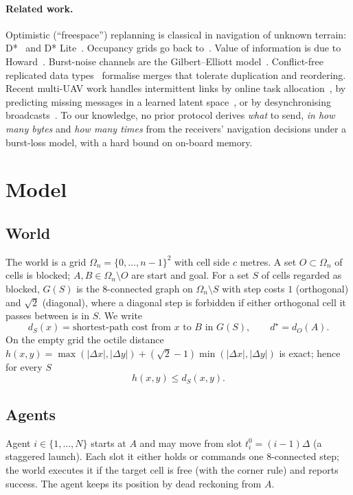 \documentclass[11pt,a4paper]{article}
\theoremstyle{definition}
\newcommand{\Om}{\Omega}
\begin{document}
\paragraph{Related work.} Optimistic (``freespace'') replanning is classical in navigation of unknown terrain: D*~\cite{stentz94} and D* Lite~\cite{koenig02}. Occupancy grids go back to~\cite{moravec85}. Value of information is due to Howard~\cite{howard66}. Burst-noise channels are the Gilbert--Elliott model~\cite{gilbert60,elliott63}. Conflict-free replicated data types~\cite{shapiro11} formalise merges that tolerate duplication and reordering. Recent multi-UAV work handles intermittent links by online task allocation~\cite{ccopi}, by predicting missing messages in a learned latent space~\cite{karakasis26}, or by desynchronising broadcasts~\cite{zhao26}. To our knowledge, no prior protocol derives \emph{what} to send, \emph{in how many bytes} and \emph{how many times} from the receivers' navigation decisions under a burst-loss model, with a hard bound on on-board memory.

\section{Model}\label{sec:model}

\subsection{World}
The world is a grid $\Om_n=\{0,\dots,n-1\}^2$ with cell side $c$ metres. A set $O\subset\Om_n$ of cells is blocked; $A,B\in\Om_n\setminus O$ are start and goal. For a set $S$ of cells regarded as blocked, $G(S)$ is the 8-connected graph on $\Om_n\setminus S$ with step costs $1$ (orthogonal) and $\sqrt2$ (diagonal), where a diagonal step is forbidden if either orthogonal cell it passes between is in $S$. We write
\[
d_S(x)=\text{shortest-path cost from }x\text{ to }B\text{ in }G(S),\qquad d^\star=d_O(A).
\]
On the empty grid the octile distance $h(x,y)=\max(|\Delta x|,|\Delta y|)+(\sqrt2-1)\min(|\Delta x|,|\Delta y|)$ is exact; hence for every $S$
\begin{equation}\label{eq:admissible}
h(x,y)\le d_S(x,y).
\end{equation}

\subsection{Agents}
Agent $i\in\{1,\dots,N\}$ starts at $A$ and may move from slot $t_i^0=(i-1)\Delta$ (a staggered launch). Each slot it either holds or commands one 8-connected step; the world executes it if the target cell is free (with the corner rule) and reports success. The agent keeps its position by dead reckoning from $A$.
\end{document}
